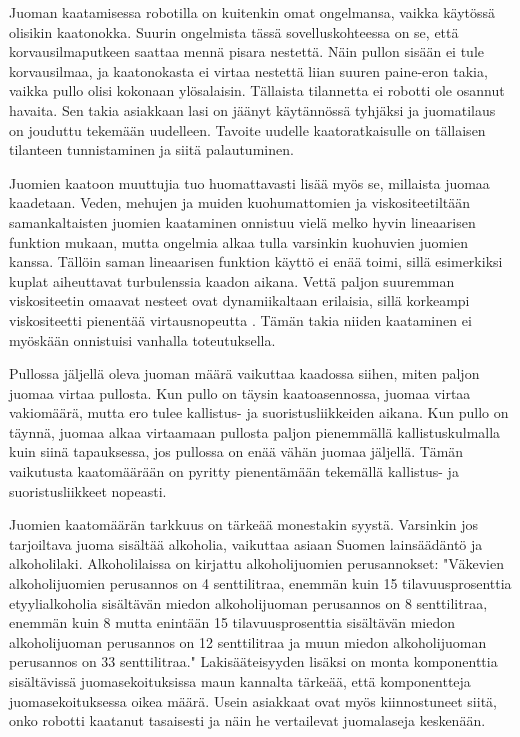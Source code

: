 Juoman kaatamisessa robotilla on kuitenkin omat ongelmansa, vaikka käytössä olisikin kaatonokka. Suurin ongelmista tässä sovelluskohteessa on se, että korvausilmaputkeen saattaa mennä pisara nestettä. Näin pullon sisään ei tule korvausilmaa, ja kaatonokasta ei virtaa nestettä liian suuren paine-eron takia, vaikka pullo olisi kokonaan ylösalaisin. Tällaista tilannetta ei robotti ole osannut havaita. Sen takia asiakkaan lasi on jäänyt käytännössä tyhjäksi ja juomatilaus on jouduttu tekemään uudelleen. Tavoite uudelle kaatoratkaisulle on tällaisen tilanteen tunnistaminen ja siitä palautuminen.

Juomien kaatoon muuttujia tuo huomattavasti lisää myös se, millaista juomaa kaadetaan. Veden, mehujen ja muiden kuohumattomien ja viskositeetiltään samankaltaisten juomien kaataminen onnistuu vielä melko hyvin lineaarisen funktion mukaan, mutta ongelmia alkaa tulla varsinkin kuohuvien juomien kanssa. Tällöin saman lineaarisen funktion käyttö ei enää toimi, sillä esimerkiksi kuplat aiheuttavat turbulenssia kaadon aikana. Vettä paljon suuremman viskositeetin omaavat nesteet ovat dynamiikaltaan erilaisia, sillä korkeampi viskositeetti pienentää virtausnopeutta \cite{Lumen2021}. Tämän takia niiden kaataminen ei myöskään onnistuisi vanhalla toteutuksella.

Pullossa jäljellä oleva juoman määrä vaikuttaa kaadossa siihen, miten paljon juomaa virtaa pullosta. Kun pullo on täysin kaatoasennossa, juomaa virtaa vakiomäärä, mutta ero tulee kallistus- ja suoristusliikkeiden aikana. Kun pullo on täynnä, juomaa alkaa virtaamaan pullosta paljon pienemmällä kallistuskulmalla kuin siinä tapauksessa, jos pullossa on enää vähän juomaa jäljellä. Tämän vaikutusta kaatomäärään on pyritty pienentämään tekemällä kallistus- ja suoristusliikkeet nopeasti.

Juomien kaatomäärän tarkkuus on tärkeää monestakin syystä. Varsinkin jos tarjoiltava juoma sisältää alkoholia, vaikuttaa asiaan Suomen lainsäädäntö ja alkoholilaki. Alkoholilaissa on kirjattu alkoholijuomien perusannokset: "Väkevien alkoholijuomien perusannos on 4 senttilitraa, enemmän kuin 15 tilavuusprosenttia etyylialkoholia sisältävän miedon alkoholijuoman perusannos on 8 senttilitraa, enemmän kuin 8 mutta enintään 15 tilavuusprosenttia sisältävän miedon alkoholijuoman perusannos on 12 senttilitraa ja muun miedon alkoholijuoman perusannos on 33 senttilitraa." \cite{Finlex2017} Lakisääteisyyden lisäksi on monta komponenttia sisältävissä juomasekoituksissa maun kannalta tärkeää, että komponentteja juomasekoituksessa oikea määrä. Usein asiakkaat ovat myös kiinnostuneet siitä, onko robotti kaatanut tasaisesti ja näin he vertailevat juomalaseja keskenään.

